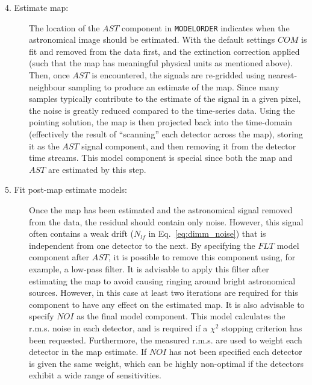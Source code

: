\documentclass[twoside,11pt]{article}
\renewcommand{\_}{\texttt{\symbol{95}}}
\newcommand{\cparam}[1]{\texttt{#1}}     %
\begin{document}
\begin{description}
\item[4. Estimate map:] The location of the $AST$ component in
  \cparam{MODELORDER} indicates when the astronomical image should be
  estimated. With the default settings $COM$ is fit and removed from
  the data first, and the extinction correction applied (such that the
  map has meaningful physical units as mentioned above). Then, once
  $AST$ is encountered, the signals are re-gridded using
  nearest-neighbour sampling to produce an estimate of the map. Since
  many samples typically contribute to the estimate of the signal in a
  given pixel, the noise is greatly reduced compared to the
  time-series data. Using the pointing solution, the map is then
  projected back into the time-domain (effectively the result of
  ``scanning'' each detector across the map), storing it as the $AST$
  signal component, and then removing it from the detector time
  streams. This model component is special since both the map and
  $AST$ are estimated by this step.

\item[5. Fit post-map estimate models:] Once the map has been
  estimated and the astronomical signal removed from the data, the
  residual should contain only noise. However, this signal often
  contains a weak drift ($N_{lf}$ in Eq.~\ref{eq:dimm_noise}) that is
  independent from one detector to the next. By specifying the $FLT$
  model component after $AST$, it is possible to remove this component
  using, for example, a low-pass filter. It is advisable to apply this
  filter after estimating the map to avoid causing ringing around
  bright astronomical sources. However, in this case at least two
  iterations are required for this component to have any effect on the
  estimated map. It is also advisable to specify $NOI$ as the final
  model component. This model calculates the r.m.s. noise in each
  detector, and is required if a $\chi^2$ stopping criterion has been
  requested. Furthermore, the measured r.m.s. are used to weight each
  detector in the map estimate. If $NOI$ has not been specified each
  detector is given the same weight, which can be highly non-optimal
  if the detectors exhibit a wide range of sensitivities.


\end{description}
\end{document}
